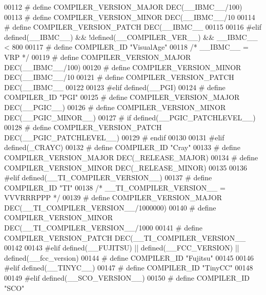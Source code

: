 \begin{DoxyCode}
{{{{{{{{{{{{{{{00112 \textcolor{preprocessor}{# define COMPILER\_VERSION\_MAJOR DEC(\_\_IBMC\_\_/100)}
00113 \textcolor{preprocessor}{# define COMPILER\_VERSION\_MINOR DEC(\_\_IBMC\_\_/10 %
00114 \textcolor{preprocessor}{# define COMPILER\_VERSION\_PATCH DEC(\_\_IBMC\_\_    %
00115 
00116 \textcolor{preprocessor}{#elif defined(\_\_IBMC\_\_) && !defined(\_\_COMPILER\_VER\_\_) && \_\_IBMC\_\_ < 800}
00117 \textcolor{preprocessor}{# define COMPILER\_ID "VisualAge"}
00118   \textcolor{comment}{/* \_\_IBMC\_\_ = VRP */}
00119 \textcolor{preprocessor}{# define COMPILER\_VERSION\_MAJOR DEC(\_\_IBMC\_\_/100)}
00120 \textcolor{preprocessor}{# define COMPILER\_VERSION\_MINOR DEC(\_\_IBMC\_\_/10 %
00121 \textcolor{preprocessor}{# define COMPILER\_VERSION\_PATCH DEC(\_\_IBMC\_\_    %
00122 
00123 \textcolor{preprocessor}{#elif defined(\_\_PGI)}
00124 \textcolor{preprocessor}{# define COMPILER\_ID "PGI"}
00125 \textcolor{preprocessor}{# define COMPILER\_VERSION\_MAJOR DEC(\_\_PGIC\_\_)}
00126 \textcolor{preprocessor}{# define COMPILER\_VERSION\_MINOR DEC(\_\_PGIC\_MINOR\_\_)}
00127 \textcolor{preprocessor}{# if defined(\_\_PGIC\_PATCHLEVEL\_\_)}
00128 \textcolor{preprocessor}{#  define COMPILER\_VERSION\_PATCH DEC(\_\_PGIC\_PATCHLEVEL\_\_)}
00129 \textcolor{preprocessor}{# endif}
00130 
00131 \textcolor{preprocessor}{#elif defined(\_CRAYC)}
00132 \textcolor{preprocessor}{# define COMPILER\_ID "Cray"}
00133 \textcolor{preprocessor}{# define COMPILER\_VERSION\_MAJOR DEC(\_RELEASE\_MAJOR)}
00134 \textcolor{preprocessor}{# define COMPILER\_VERSION\_MINOR DEC(\_RELEASE\_MINOR)}
00135 
00136 \textcolor{preprocessor}{#elif defined(\_\_TI\_COMPILER\_VERSION\_\_)}
00137 \textcolor{preprocessor}{# define COMPILER\_ID "TI"}
00138   \textcolor{comment}{/* \_\_TI\_COMPILER\_VERSION\_\_ = VVVRRRPPP */}
00139 \textcolor{preprocessor}{# define COMPILER\_VERSION\_MAJOR DEC(\_\_TI\_COMPILER\_VERSION\_\_/1000000)}
00140 \textcolor{preprocessor}{# define COMPILER\_VERSION\_MINOR DEC(\_\_TI\_COMPILER\_VERSION\_\_/1000   %
00141 \textcolor{preprocessor}{# define COMPILER\_VERSION\_PATCH DEC(\_\_TI\_COMPILER\_VERSION\_\_        %
00142 
00143 \textcolor{preprocessor}{#elif defined(\_\_FUJITSU) || defined(\_\_FCC\_VERSION) || defined(\_\_fcc\_version)}
00144 \textcolor{preprocessor}{# define COMPILER\_ID "Fujitsu"}
00145 
00146 \textcolor{preprocessor}{#elif defined(\_\_TINYC\_\_)}
00147 \textcolor{preprocessor}{# define COMPILER\_ID "TinyCC"}
00148 
00149 \textcolor{preprocessor}{#elif defined(\_\_SCO\_VERSION\_\_)}
00150 \textcolor{preprocessor}{# define COMPILER\_ID "SCO"}
}}}}}}}}}}}}}}}}}}}}}
\end{DoxyCode}
